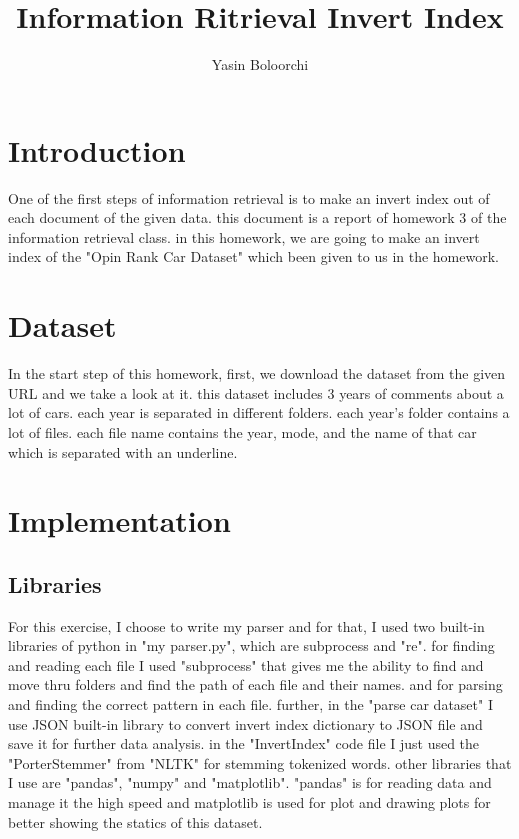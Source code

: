 \documentclass[a4paper]{article}
\begin{document}
\title{Information Ritrieval Invert Index}
\author{Yasin Boloorchi}

\maketitle

\section{Introduction}	\label{section.intro}
One of the first steps of information retrieval is to make an invert index out of each document of the given data. this document is a report of homework 3 of the information retrieval class. in this homework, we are going to make an invert index of the "Opin Rank Car Dataset" which been given to us in the homework.

\section{Dataset}	\label{section.dataset}
In the start step of this homework, first, we download the dataset from the given URL and we take a look at it. this dataset includes 3 years of comments about a lot of cars. each year is separated in different folders. each year's folder contains a lot of files. each file name contains the year, mode, and the name of that car which is separated with an underline.

\section{Implementation}	\label{section.implement}

	\subsection{Libraries}	\label{section.implement.lib}
	For this exercise, I choose to write my parser and for that, I used two built-in libraries of python in "my parser.py", which are subprocess and "re". for finding and reading each file I used "subprocess" that gives me the ability to find and move thru folders and find the path of each file and their names. and for parsing and finding the correct pattern in each file.
	further, in the "parse car dataset" I use JSON built-in library to convert invert index dictionary to JSON file and save it for further data analysis.
	in the "InvertIndex" code file I just used the "PorterStemmer" from "NLTK" for stemming tokenized words.
	other libraries that I use are "pandas", "numpy" and "matplotlib". "pandas" is for reading data and manage it the high speed and matplotlib is used for plot and drawing plots for better showing the statics of this dataset.
	
\end{document}
